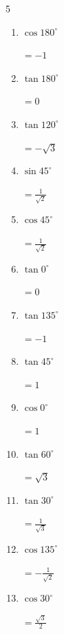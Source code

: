\begin{multicols}{5}
\begin{enumerate}
  \item $\displaystyle \cos{180^\circ}$

        $\displaystyle =-1$

  \item $\displaystyle \tan{180^\circ}$

        $\displaystyle =0$

  \item $\displaystyle \tan{120^\circ}$

        $\displaystyle =-\sqrt{3}$

  \item $\displaystyle \sin{45^\circ}$

        $\displaystyle =\frac{1}{\sqrt{2}}$

  \item $\displaystyle \cos{45^\circ}$

        $\displaystyle =\frac{1}{\sqrt{2}}$

  \item $\displaystyle \tan{0^\circ}$

        $\displaystyle =0$

  \item $\displaystyle \tan{135^\circ}$

        $\displaystyle =-1$

  \item $\displaystyle \tan{45^\circ}$

        $\displaystyle =1$

  \item $\displaystyle \cos{0^\circ}$

        $\displaystyle =1$

  \item $\displaystyle \tan{60^\circ}$

        $\displaystyle =\sqrt{3}$

  \item $\displaystyle \tan{30^\circ}$

        $\displaystyle =\frac{1}{\sqrt{3}}$

  \item $\displaystyle \cos{135^\circ}$

        $\displaystyle =-\frac{1}{\sqrt{2}}$

\columnbreak %

\resetques

  \item $\displaystyle \cos{30^\circ}$

        $\displaystyle =\frac{\sqrt{3}}{2}$


\end{enumerate}
\end{multicols}
